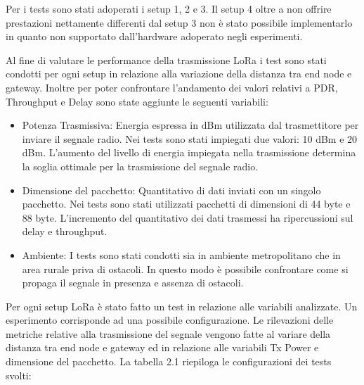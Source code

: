 \documentclass[12pt,a4paper,openright,twoside]{report}
\begin{document}
Per i tests sono stati adoperati i setup 1, 2 e 3. Il setup 4 oltre a non offrire prestazioni nettamente differenti dal setup 3 non \`e stato possibile implementarlo in quanto non supportato dall'hardware adoperato negli esperimenti.  

Al fine di valutare le performance della trasmissione LoRa i test sono stati condotti per ogni setup in relazione alla variazione della distanza tra end node e gateway. Inoltre per poter confrontare l'andamento dei valori relativi a PDR, Throughput e Delay sono state aggiunte le seguenti variabili:   
\begin{itemize}   
\item Potenza Trasmissiva: Energia espressa in dBm utilizzata dal trasmettitore per inviare il segnale radio. Nei tests sono stati impiegati due valori: 10 dBm e 20 dBm. L'aumento del livello di energia impiegata nella trasmissione determina la soglia ottimale per la trasmissione del segnale radio.     
\item Dimensione del pacchetto: Quantitativo di dati inviati con un singolo pacchetto. Nei tests sono stati utilizzati pacchetti di dimensioni di 44 byte e 88 byte. L'incremento del quantitativo dei dati trasmessi ha ripercussioni sul delay e throughput.   
\item Ambiente: I tests sono stati condotti sia in ambiente metropolitano che in area rurale priva di ostacoli. In questo modo \`e possibile confrontare come si propaga il segnale in presenza e assenza di ostacoli. 
\end{itemize}

Per ogni setup LoRa \`e stato fatto un test in relazione alle variabili analizzate.
Un esperimento corrisponde ad una possibile configurazione. Le rilevazioni delle metriche relative alla trasmissione del segnale vengono fatte al variare della distanza tra end node e gateway ed in relazione alle variabili Tx Power e dimensione del pacchetto. 
La tabella 2.1 riepiloga le configurazioni dei tests svolti:
\end{document}
